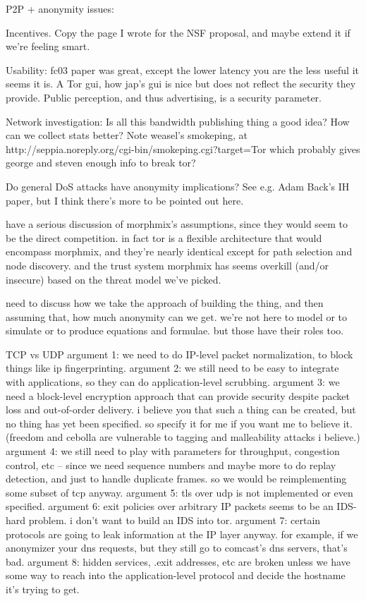\documentclass{llncs}
\begin{document}
P2P + anonymity issues:

Incentives. Copy the page I wrote for the NSF proposal, and maybe extend
it if we're feeling smart.

Usability: fc03 paper was great, except the lower latency you are the
less useful it seems it is.
A Tor gui, how jap's gui is nice but does not reflect the security
they provide.
Public perception, and thus advertising, is a security parameter.

Network investigation: Is all this bandwidth publishing thing a good idea?
How can we collect stats better? Note weasel's smokeping, at
http://seppia.noreply.org/cgi-bin/smokeping.cgi?target=Tor
which probably gives george and steven enough info to break tor?

Do general DoS attacks have anonymity implications? See e.g. Adam
Back's IH paper, but I think there's more to be pointed out here.


have a serious discussion of morphmix's assumptions, since they would
seem to be the direct competition. in fact tor is a flexible architecture
that would encompass morphmix, and they're nearly identical except for
path selection and node discovery. and the trust system morphmix has
seems overkill (and/or insecure) based on the threat model we've picked.

need to discuss how we take the approach of building the thing, and then
assuming that, how much anonymity can we get. we're not here to model or
to simulate or to produce equations and formulae. but those have their
roles too.







TCP vs UDP
argument 1: we need to do IP-level packet normalization, to block things like ip
fingerprinting.
argument 2: we still need to be easy to integrate with applications, so they can do
application-level scrubbing.
argument 3: we need a block-level encryption approach that can provide security despite
packet loss and out-of-order delivery. i believe you that such a thing can be created,
but no thing has yet been specified. so specify it for me if you want me to believe it.
(freedom and cebolla are vulnerable to tagging and malleability attacks i believe.)
argument 4: we still need to play with parameters for throughput, congestion control,
etc -- since we need sequence numbers and maybe more to do replay detection,
and just to handle duplicate frames. so we would be reimplementing some subset of tcp
anyway.
argument 5: tls over udp is not implemented or even specified.
argument 6: exit policies over arbitrary IP packets seems to be an IDS-hard problem. i
don't want to build an IDS into tor.
argument 7: certain protocols are going to leak information at the IP layer anyway. for
example, if we anonymizer your dns requests, but they still go to comcast's dns servers,
that's bad.
argument 8: hidden services, .exit addresses, etc are broken unless we have some way to
reach into the application-level protocol and decide the hostname it's trying to get.

 
\end{document}
